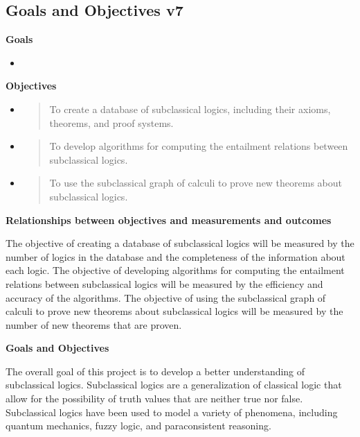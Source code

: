 \hypertarget{goals-and-objectives-v7}{%
\subsection{Goals and Objectives v7}\label{goals-and-objectives-v7}}

\textbf{Goals}

\begin{itemize}
\tightlist
\item
\end{itemize}

\textbf{Objectives}

\begin{itemize}
\item
  \begin{quote}
  To create a database of subclassical logics, including their axioms,
  theorems, and proof systems.
  \end{quote}
\item
  \begin{quote}
  To develop algorithms for computing the entailment relations between
  subclassical logics.
  \end{quote}
\item
  \begin{quote}
  To use the subclassical graph of calculi to prove new theorems about
  subclassical logics.
  \end{quote}
\end{itemize}

\textbf{Relationships between objectives and measurements and outcomes}

The objective of creating a database of subclassical logics will be
measured by the number of logics in the database and the completeness of
the information about each logic. The objective of developing algorithms
for computing the entailment relations between subclassical logics will
be measured by the efficiency and accuracy of the algorithms. The
objective of using the subclassical graph of calculi to prove new
theorems about subclassical logics will be measured by the number of new
theorems that are proven.

\textbf{Goals and Objectives}

The overall goal of this project is to develop a better understanding of
subclassical logics. Subclassical logics are a generalization of
classical logic that allow for the possibility of truth values that are
neither true nor false. Subclassical logics have been used to model a
variety of phenomena, including quantum mechanics, fuzzy logic, and
paraconsistent reasoning.

